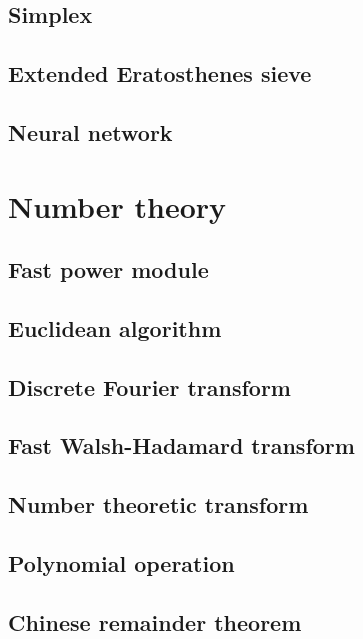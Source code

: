 \documentclass[titlepage,a4paper,10pt]{article}
\begin{document}
\begin{multicols}{2}
\begin{spacing}{0.6}
{			\subsection{Simplex}
				
			\subsection{Extended Eratosthenes sieve}
				
			\subsection{Neural network}
				
		\section{Number theory}
			\subsection{Fast power module}
				
			\subsection{Euclidean algorithm}
				
			\subsection{Discrete Fourier transform}
				
			\subsection{Fast Walsh-Hadamard transform}
				
			\subsection{Number theoretic transform}
				
			\subsection{Polynomial operation}
				
			\subsection{Chinese remainder theorem}
				
}
\end{spacing}
\end{multicols}
\end{document}
